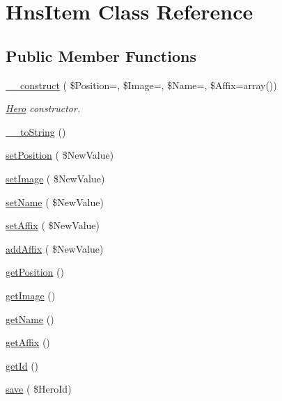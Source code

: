 \hypertarget{class_hns_item}{}\section{Hns\+Item Class Reference}
\label{class_hns_item}
\subsection*{Public Member Functions}
\begin{DoxyCompactItemize}
\item 
\hyperlink{class_hns_item_ace799b6ba81686427503fd42b945979a}{\+\_\+\+\_\+construct} ( \$Position=\textquotesingle{}\textquotesingle{}, \$Image=\textquotesingle{}\textquotesingle{}, \$Name=\textquotesingle{}\textquotesingle{}, \$Affix=array())
\begin{DoxyCompactList}\small\item\em \hyperlink{class_hero}{Hero} constructor. \end{DoxyCompactList}\item 
\hyperlink{class_hns_item_a3e80812a11f8168e50f1fdd34a49e113}{\+\_\+\+\_\+to\+String} ()
\item 
\hyperlink{class_hns_item_a0705d47d8fe9bb296e5fac7c23b3752a}{set\+Position} ( \$New\+Value)
\item 
\hyperlink{class_hns_item_a5d2645b1fd9a7add6562058d93abcc47}{set\+Image} ( \$New\+Value)
\item 
\hyperlink{class_hns_item_a347826422c7beca099e7e82c87e4348b}{set\+Name} ( \$New\+Value)
\item 
\hyperlink{class_hns_item_a20c4ab14e64c68fb03cf625ef1936417}{set\+Affix} ( \$New\+Value)
\item 
\hyperlink{class_hns_item_add602751df64740948324ec012e6b299}{add\+Affix} ( \$New\+Value)
\item 
\hyperlink{class_hns_item_a89770f3d67b80293567f73c97956a8c5}{get\+Position} ()
\item 
\hyperlink{class_hns_item_ae5cd3d2e3d7262351bf2389140a4ed82}{get\+Image} ()
\item 
\hyperlink{class_hns_item_a38f677cc34448a5ae5abfb8d9ddd4b5d}{get\+Name} ()
\item 
\hyperlink{class_hns_item_a264b19ff1bd548f7e315827fb0099d51}{get\+Affix} ()
\item 
\hyperlink{class_hns_item_a8d205548bb600f1c207fb726ea5d5dcc}{get\+Id} ()
\item 
\hyperlink{class_hns_item_a9f17e98c91bac235e4b0e73a7635daef}{save} ( \$Hero\+Id)
\end{DoxyCompactItemize}
